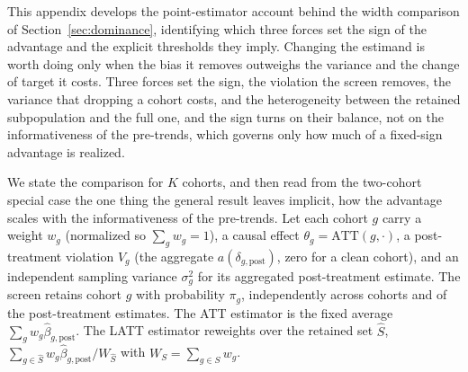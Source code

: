 \documentclass[12pt]{article}
\theoremstyle{remark}
\begin{document}
This appendix develops the point-estimator account behind the width comparison of
Section~\ref{sec:dominance}, identifying which three forces set the sign of the advantage and the explicit
thresholds they imply. Changing the estimand is worth doing only when the bias it removes outweighs the variance and
the change of target it costs. Three forces set the sign, the violation the screen removes, the variance
that dropping a cohort costs, and the heterogeneity between the retained subpopulation and the full
one, and the sign turns on their balance, not on the informativeness of the pre-trends, which governs only
how much of a fixed-sign advantage is realized.

We state the comparison for $K$ cohorts, and then read from the two-cohort special case
the one thing the general result leaves implicit, how the advantage scales with the
informativeness of the pre-trends. Let each cohort $g$ carry a weight
$w_g$ (normalized so $\sum_{g}w_g=1$), a causal effect $\theta_g=\mathrm{ATT}(g,\cdot)$,
a post-treatment violation $V_g$ (the aggregate $a(\delta_{g,\mathrm{post}})$, zero for a
clean cohort), and an independent sampling variance $\sigma_g^2$ for its aggregated
post-treatment estimate. The screen retains cohort $g$ with probability $\pi_g$,
independently across cohorts and of the post-treatment estimates. The ATT estimator is
the fixed average $\sum_g w_g\hat\beta_{g,\mathrm{post}}$. The LATT estimator reweights
over the retained set $\hat S$, $\sum_{g\in\hat S}w_g\hat\beta_{g,\mathrm{post}}/W_{\hat S}$
with $W_S=\sum_{g\in S}w_g$.
\end{document}
